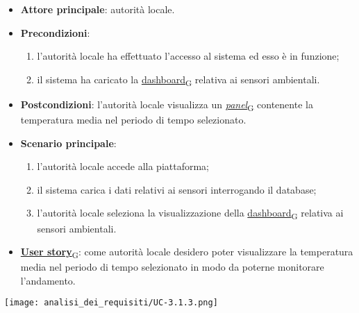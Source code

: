 \begin{itemize}
	\item \textbf{Attore principale}: autorità locale.
	\item \textbf{Precondizioni}:
	      \begin{enumerate}
		      \item l'autorità locale ha effettuato l'accesso al sistema ed esso è in funzione;
		      \item il sistema ha caricato la \href{https://7last.github.io/docs/pb/documentazione-interna/glossario\#dashboard}{dashboard\textsubscript{G}} relativa ai sensori ambientali.
	      \end{enumerate}
	\item \textbf{Postcondizioni}: l'autorità locale visualizza un \href{https://7last.github.io/docs/pb/documentazione-interna/glossario\#panel}{\textit{panel}\textsubscript{G}} contenente la temperatura media nel periodo di tempo selezionato.
	\item \textbf{Scenario principale}:
	      \begin{enumerate}
		      \item l'autorità locale accede alla piattaforma;
		      \item il sistema carica i dati relativi ai sensori interrogando il database;
		      \item l'autorità locale seleziona la visualizzazione della \href{https://7last.github.io/docs/pb/documentazione-interna/glossario\#dashboard}{dashboard\textsubscript{G}} relativa ai sensori ambientali.
	      \end{enumerate}
	\item \href{https://7last.github.io/docs/pb/documentazione-interna/glossario\#user-story}{\textbf{User story}\textsubscript{G}}: come autorità locale desidero poter visualizzare la temperatura media nel periodo di tempo selezionato
	      in modo da poterne monitorare l'andamento.
\end{itemize}
\begin{center}
	\texttt{[image: analisi\_dei\_requisiti/UC-3.1.3.png]}
\end{center}



